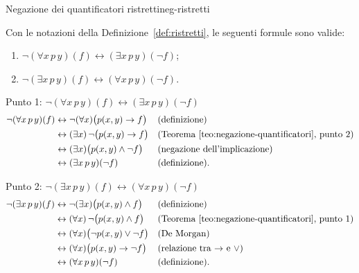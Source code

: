 \begin{concetto}
\begin{Proposizione}{Negazione dei quantificatori ristretti}{neg-ristretti}
    \begin{prerequisiti}
    \end{prerequisiti}
    Con le notazioni della Definizione~\ref{def:ristretti}, le seguenti formule sono valide:
    \begin{enumerate}
        \item $\neg(\forall x\, p\, y)(f) \leftrightarrow (\exists x\, p\, y)(\neg f)$;
        \item $\neg(\exists x\, p\, y)(f) \leftrightarrow (\forall x\, p\, y)(\neg f)$.
    \end{enumerate}
\end{Proposizione}

\begin{dimostrazione}
    \begin{caso}{Punto 1: $\neg(\forall x\, p\, y)(f) \leftrightarrow (\exists x\, p\, y)(\neg f)$}
    \[
    \begin{aligned}
        \neg(\forall x\, p\, y)(f) &\leftrightarrow \neg(\forall x)\big(p(x,y) \rightarrow f\big) && \text{(definizione)}\\
        &\leftrightarrow (\exists x)\,\neg\big(p(x,y) \rightarrow f\big) && \text{(Teorema~\ref{teo:negazione-quantificatori}, punto 2)}\\
        &\leftrightarrow (\exists x)\big(p(x,y) \wedge \neg f\big) && \text{(negazione dell'implicazione)}\\
        &\leftrightarrow (\exists x\, p\, y)(\neg f) && \text{(definizione)}.
    \end{aligned}
    \]
    \end{caso}
    \begin{caso}{Punto 2: $\neg(\exists x\, p\, y)(f) \leftrightarrow (\forall x\, p\, y)(\neg f)$}
    \[
    \begin{aligned}
        \neg(\exists x\, p\, y)(f) &\leftrightarrow \neg(\exists x)\big(p(x,y) \wedge f\big) && \text{(definizione)}\\
        &\leftrightarrow (\forall x)\,\neg\big(p(x,y) \wedge f\big) && \text{(Teorema~\ref{teo:negazione-quantificatori}, punto 1)}\\
        &\leftrightarrow (\forall x)\big(\neg p(x,y) \vee \neg f\big) && \text{(De Morgan)}\\
        &\leftrightarrow (\forall x)\big(p(x,y) \rightarrow \neg f\big) && \text{(relazione tra $\rightarrow$ e $\vee$)}\\
        &\leftrightarrow (\forall x\, p\, y)(\neg f) && \text{(definizione)}.
    \end{aligned}
    \]
    \end{caso}
\end{dimostrazione}
\end{concetto}

